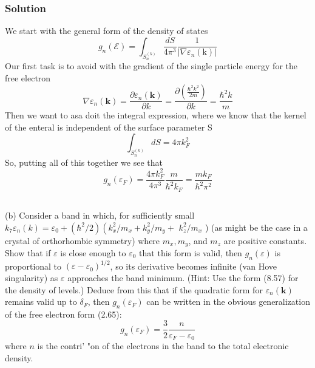\documentclass[12pt]{article}
\begin{document}
\subsubsection{Solution}
We start with the general form of the density of states
\begin{equation}
g_n(\mathcal{E})=\int_{S_n^{(k)}} \frac{d S}{4 \pi^3} \frac{1}{\left|\nabla \varepsilon_n(\mathrm{k})\right|}
\end{equation}
Our first task is to avoid with the gradient of the single particle energy for the free electron
\begin{equation}
\nabla \varepsilon_n(\mathbf{k}) = \frac{\partial \varepsilon_n(\mathbf{k})}{\partial k} = \frac{\partial \left(\frac{\hbar^2 k^2}{2m}\right)}{\partial k} = \frac{\hbar^2 k}{m}
\end{equation}
Then we want to asa doit the integral expression,  where we know that the kernel of the enteral is independent of the surface parameter S
\begin{equation}
\int_{S_n^{(k)}} dS = 4\pi k_F^2
\end{equation}
So, putting all of this together we see that
\begin{equation}
g_n(\varepsilon_F) = \frac{4\pi k_F^2}{4\pi^3}\frac{m}{\hbar^2 k_F} = \frac{m k_F}{\hbar^2 \pi^2}
\end{equation}
\subsection{}
(b) Consider a band in which, for sufficiently small $k_7 \varepsilon_n(k)=\varepsilon_0+\left(\hbar^2 / 2\right)\left(k_x^2 / m_x+k_y^2 / m_y+\right.$ $k_z^2 / m_x$ ) (as might be the case in a crystal of orthorhombic symmetry) where $m_x, m_y$, and $m_z$ are positive constants. Show that if $\varepsilon$ is close enough to $\varepsilon_0$ that this form is valid, then $g_n(\varepsilon)$ is proportional to $\left(\varepsilon-\varepsilon_0\right)^{1 / 2}$, so its derivative becomes infinite (van Hove singularity) as $\varepsilon$ approaches the band minimum. (Hint: Use the form (8.57) for the density of levels.) Deduce from this that if the quadratic form for $\varepsilon_n(\mathbf{k})$ remains valid up to $\delta_F$, then $g_n\left(\varepsilon_F\right)$ can be written in the obvious generalization of the free electron form (2.65):
$$
g_n\left(\varepsilon_F\right)=\frac{3}{2} \frac{n}{\varepsilon_F-\varepsilon_0}
$$
where $n$ is the contri' "on of the electrons in the band to the total electronic density.
\end{document}
